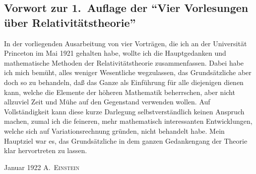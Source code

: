 

\subsection*{Vorwort zur 1.\ Auflage der \enquote{Vier Vorlesungen über Relativitätstheorie}}

In der vorliegenden Ausarbeitung von vier Vorträgen, die ich an der Universität Princeton im Mai 1921 gehalten habe, wollte ich die Hauptgedanken und mathematische Methoden der Relativitätstheorie zusammenfassen. Dabei habe ich mich bemüht, alles weniger Wesentliche wegzulassen, das Grundsätzliche aber doch so zu behandeln, daß das Ganze als Einführung für alle diejenigen dienen kann, welche die Elemente der höheren Mathematik beherrschen, aber nicht allzuviel Zeit und Mühe auf den Gegenstand verwenden wollen. Auf Vollständigkeit kann diese kurze Darlegung selbstverständlich keinen Anspruch machen, zumal ich die feineren, mehr mathematisch interessanten Entwicklungen, welche sich auf Variationsrechnung gründen, nicht behandelt habe. Mein Hauptziel war es, das Grundsätzliche in dem ganzen Gedankengang der Theorie klar hervortreten zu lassen.

Januar 1922 \hfill A.\ \textsc{Einstein} \hspace{1.5em}

